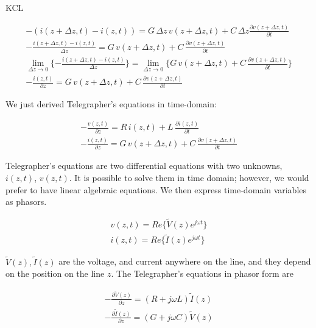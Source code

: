 \documentclass{ximera}
\begin{document}
KCL

\begin{eqnarray}
-( i(z+ \Delta z ,t)- i(z,t))= G  \, \Delta z  \, v(z+\Delta z,t)+ C \, \Delta z
\frac{\partial v(z+\Delta z,t)}{\partial t} \label{te1kc11} \\
-\frac{ i(z+ \Delta z ,t)- i(z,t)}{\Delta z}= G  \, v(z+\Delta z,t)+C \, 
\frac{\partial v(z+\Delta z,t)}{\partial t} \label{te1kc21} \\
\lim_{\Delta z \to 0} \{-\frac{ i(z+ \Delta z ,t)- i(z,t)}{\Delta z} \}= \lim_{\Delta z \to 0} \{ G  \, v(z+\Delta z,t)+C \, 
\frac{\partial v(z+\Delta z,t)}{\partial t} \} \label{te1kc211} \\
-\frac{i(z,t) }{\partial z}= G  \, v(z+\Delta z,t)+C \, 
\frac{\partial v(z+\Delta z,t)}{\partial t} \label{te1kc31}
\end{eqnarray}



We just derived Telegrapher's equations in time-domain:



\begin{eqnarray}
-\frac{v(z,t) }{\partial z}=R  \, i(z,t)+L  \, 
 \frac{\partial i(z,t)}{\partial t} \nonumber  \\ \nonumber
-\frac{i(z,t) }{\partial z}= G \,  v(z+\Delta z,t)+C \, 
\frac{\partial v(z+\Delta z,t)}{\partial t} 
\end{eqnarray}


Telegrapher's equations are two differential equations with two unknowns, $i(z, t)$, $v(z, t)$. It is possible to solve them in time domain; however, we would prefer to have linear algebraic equations. We then express time-domain variables as phasors.

\begin{eqnarray}
v(z,t)=Re\{ \tilde{V}(z) e^{j \omega t} \} \nonumber \\
i(z,t)=Re\{ \tilde{I}(z) e^{j \omega t} \} \nonumber
\end{eqnarray}

 $\tilde{V}(z),\tilde{I}(z) $ are the voltage, and current anywhere on the line, and they depend on the position on the line $z$. The Telegrapher's equations in phasor form are


\begin{eqnarray}
-\frac{\partial \tilde{V}(z)}{\partial z} = (R+j\omega L) \tilde{I}(z) \label{te11}\\
-\frac{\partial \tilde{I}(z)}{\partial z} = (G+j\omega C) \tilde{V}(z) \label{te121}
\end{eqnarray}
\end{document}

